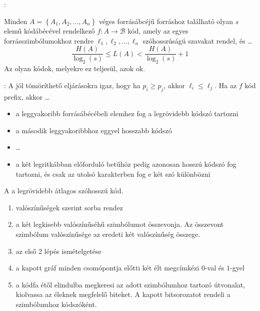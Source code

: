 \documentclass[main.tex]{subfiles}
\begin{document}
  {\large {}:}
  \vspace{.5em}
  
  Minden $A = \left\{ A_1, A_2, \dots , A_n \right\}$
  véges forrásábcéjű forráshoz található olyan $s$ elemű
  kódábécével rendelkező $f: A \rightarrow \mathcal{B}$
  kód, amely az egyes forrásszimbólumokhoz rendre
  $\ell_1, \ell_2, \dots, \ell_n$ szóhosszúságú szavakat
  rendel, és \dots
  \begin{equation*}
    \frac{H(A)}{\log_2(s)}
    \leq L(A)
    < \frac{H(A)}{\log_2(s)} + 1
  \end{equation*}
  Az olyan kódok, melyekre ez teljesül, azok ok.
  
  \pagebreak
  {\large {}:}
  \vspace{.5em}
  A jól tömöríthető eljárásokra igaz, hogy ha $p_i \geq p_j$,
  akkor $\ell_i \leq \ell_j$. Ha az $f$  kód prefix,
  akkor \dots
  \begin{itemize}
    \item a leggyakoribb forrásábécébeli elemhez
    fog a legrövidebb kódszó tartozni

    \item a második leggyakoribbhoz eggyel hosszabb kódszó
    
    \item \dots
    
    \item a két legritkábban előforduló betűhöz
    pedig azonosan hosszú kódszó fog tartozni,
    és csak az utolsó karakterben fog e két szó különbözni
  \end{itemize}


  A  a legrövidebb átlagos
  szóhosszú  kód.
  \begin{enumerate}
    \item valószínűségek szerint sorba rendez
    
    \item a két legkisebb valószínűséhű szimbólumot
    összevonja. Az összevont szimbólum valószínűsége
    az eredeti két valószínűség összege.

    \item az első 2 lépés ismételgetése
    
    \item a kapott gráf minden csomópontja előtti
    két élt megcímkézi $0$-val és $1$-gyel

    \item a kódfa étől elindulba megkeresi
    az adott szimbólumhoz tartozó útvonalat, kiolvassa
    az éleknek megfelelő biteket. A kapott bitsorozatot
    rendeli a szimbólumhoz kódszóként.
  \end{enumerate}
\end{document}
